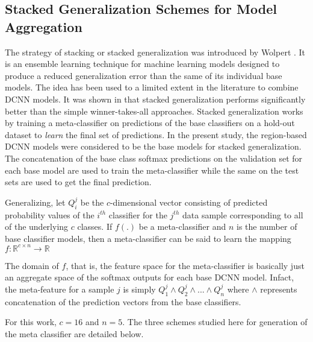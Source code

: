 \documentclass[10pt,conference,a4paper]{IEEEtran}
\begin{document}
\subsection{Stacked Generalization Schemes for Model Aggregation}
The strategy of stacking or stacked generalization was introduced by Wolpert \cite{wolpert1992}. It is an ensemble learning technique for machine learning models designed to produce a reduced generalization error than the same of its individual base models. The idea has been used to a limited extent in the literature to combine DCNN models. It was shown in \cite{roy2016generalized} that stacked generalization performs significantly better than the simple winner-takes-all approaches.
Stacked generalization works by training a meta-classifier on predictions of the base classifiers on a hold-out dataset to \textit{learn} the final set of predictions. In the present study, the region-based DCNN models were considered to be the base models for stacked generalization. The concatenation of the base class softmax predictions on the validation set for each base model are used to train the meta-classifier while the same on the test sets are used to get the final prediction.


Generalizing, let $Q^j_i$ be the $c$-dimensional vector consisting of predicted probability values of the $i^{th}$ classifier for the $j^{th}$ data sample corresponding to all of the underlying $c$ classes. If $f(.)$ be a meta-classifier and $n$ is the number of base classifier models, then a meta-classifier can be said to learn the mapping $ f: \mathbb{R}^{c\times n} \rightarrow \mathbb{R}$


The domain of $f$, that is, the feature space for the meta-classifier is basically just an aggregate space of the softmax outputs for each base DCNN model. Infact, the meta-feature for a sample $j$ is simply $Q^j_1 \wedge Q^j_2 \wedge ... \wedge Q^j_n$ where $\wedge$ represents concatenation of the prediction vectors from the base classifiers.


For this work, $c=16$ and $n=5$. The three schemes studied here for generation of the meta classifier are detailed below.
\end{document}
